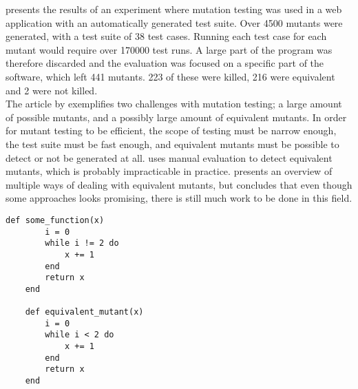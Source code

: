 \citet{article:mutation} presents the results of an experiment where
mutation testing was used in a web application with an automatically
generated test suite. Over 4500 mutants were generated, with a test suite
of 38 test cases. Running each test case for each mutant would require
over 170000 test runs. A large part of the program was therefore
discarded and the evaluation was focused on a specific part of the
software, which left 441 mutants. 223 of these were killed, 216 were
equivalent and 2 were not killed.\\

The article by \citeauthor{article:mutation} exemplifies two challenges
with mutation testing; a large amount of possible mutants, and a
possibly large amount of equivalent mutants. In order for mutant testing
to be efficient, the scope of testing must be narrow enough, the test
suite must be fast enough, and equivalent mutants must be possible to
detect or not be generated at all. \citeauthor{article:mutation} uses
manual evaluation to detect equivalent mutants, which is probably
impracticable in practice. \citet{article:eq_mutant} presents an
overview of multiple ways of dealing with equivalent mutants, but
concludes that even though some approaches looks promising, there is
still much work to be done in this field.\\

\begin{lstlisting}[caption=Example of a program with an equivalent mutant,
                   label=lst:mutation_eq, float=t]
    def some_function(x)
        i = 0
        while i != 2 do
            x += 1
        end
        return x
    end

    def equivalent_mutant(x)
        i = 0
        while i < 2 do
            x += 1
        end
        return x
    end
\end{lstlisting}
